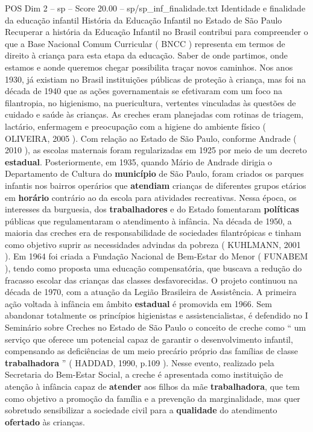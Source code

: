 \begin{textsample}{POS Dim 2 – sp – Score 20.00 – sp/sp\_inf\_finalidade.txt}  \label{ex:f2_pos_204}
Identidade e finalidade da educação infantil História da Educação Infantil no Estado de São Paulo Recuperar a história da Educação Infantil no Brasil contribui para compreender o que a Base Nacional Comum Curricular ( BNCC ) representa em termos de direito à criança para esta etapa da educação.
Saber de onde partimos, onde estamos e aonde queremos chegar possibilita traçar novos caminhos.
Nos anos 1930, já existiam no Brasil instituições públicas de proteção à criança, mas foi na década de 1940 que as ações governamentais se efetivaram com um foco na filantropia, no higienismo, na puericultura, vertentes vinculadas às questões de cuidado e saúde às crianças.
As creches eram planejadas com rotinas de triagem, lactário, enfermagem e preocupação com a higiene do ambiente físico ( OLIVEIRA, 2005 ).
Com relação ao Estado de São Paulo, conforme Andrade ( 2010 ), as escolas maternais foram regularizadas em 1925 por meio de um decreto \textbf{estadual}.
Posteriormente, em 1935, quando Mário de Andrade dirigia o Departamento de Cultura do \textbf{município} de São Paulo, foram criados os parques infantis nos bairros operários que \textbf{atendiam} crianças de diferentes grupos etários em \textbf{horário} contrário ao da escola para atividades recreativas.
Nessa época, os interesses da burguesia, dos \textbf{trabalhadores} e do Estado fomentaram \textbf{políticas} públicas que regulamentaram o atendimento à infância.
Na década de 1950, a maioria das creches era de responsabilidade de sociedades filantrópicas e tinham como objetivo suprir as necessidades advindas da pobreza ( KUHLMANN, 2001 ).
Em 1964 foi criada a Fundação Nacional de Bem-Estar do Menor ( FUNABEM ), tendo como proposta uma educação compensatória, que buscava a redução do fracasso escolar das crianças das classes desfavorecidas.
O projeto continuou na década de 1970, com a atuação da Legião Brasileira de Assistência.
A primeira ação voltada à infância em âmbito \textbf{estadual} é promovida em 1966.
Sem abandonar totalmente os princípios higienistas e assistencialistas, é defendido no I Seminário sobre Creches no Estado de São Paulo o conceito de creche como “ um serviço que oferece um potencial capaz de garantir o desenvolvimento infantil, compensando as deficiências de um meio precário próprio das famílias de classe \textbf{trabalhadora} ” ( HADDAD, 1990, p.109 ).
Nesse evento, realizado pela Secretaria do Bem-Estar Social, a creche é apresentada como instituição de atenção à infância capaz de \textbf{atender} aos filhos da mãe \textbf{trabalhadora}, que tem como objetivo a promoção da família e a prevenção da marginalidade, mas quer sobretudo sensibilizar a sociedade civil para a \textbf{qualidade} do atendimento \textbf{ofertado} às crianças.

\end{textsample}

